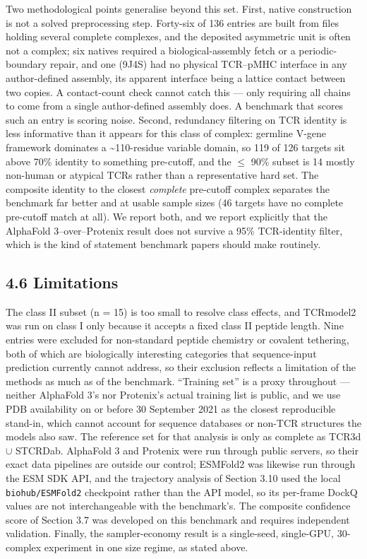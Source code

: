 \documentclass[
  11pt,
]{article}
\begin{document}
Two methodological points generalise beyond this set. First, native
construction is not a solved preprocessing step. Forty-six of 136
entries are built from files holding several complete complexes, and the
deposited asymmetric unit is often not a complex; six natives required a
biological-assembly fetch or a periodic-boundary repair, and one (9J4S)
had no physical TCR--pMHC interface in any author-defined assembly, its
apparent interface being a lattice contact between two copies. A
contact-count check cannot catch this --- only requiring all chains to
come from a single author-defined assembly does. A benchmark that scores
such an entry is scoring noise. Second, redundancy filtering on TCR
identity is less informative than it appears for this class of complex:
germline V-gene framework dominates a \textasciitilde110-residue
variable domain, so 119 of 126 targets sit above 70\% identity to
something pre-cutoff, and the \ensuremath{\leq} 90\% subset is 14 mostly non-human or
atypical TCRs rather than a representative hard set. The composite
identity to the closest \emph{complete} pre-cutoff complex separates the
benchmark far better and at usable sample sizes (46 targets have no
complete pre-cutoff match at all). We report both, and we report
explicitly that the AlphaFold 3--over--Protenix result does not survive
a 95\% TCR-identity filter, which is the kind of statement benchmark
papers should make routinely.

\subsection{4.6 Limitations}\label{limitations}

The class II subset (n = 15) is too small to resolve class effects, and
TCRmodel2 was run on class I only because it accepts a fixed class II
peptide length. Nine entries were excluded for non-standard peptide
chemistry or covalent tethering, both of which are biologically
interesting categories that sequence-input prediction currently cannot
address, so their exclusion reflects a limitation of the methods as much
as of the benchmark. ``Training set'' is a proxy throughout --- neither
AlphaFold 3's nor Protenix's actual training list is public, and we use
PDB availability on or before 30 September 2021 as the closest
reproducible stand-in, which cannot account for sequence databases or
non-TCR structures the models also saw. The reference set for that
analysis is only as complete as TCR3d \ensuremath{\cup} STCRDab. AlphaFold 3 and
Protenix were run through public servers, so their exact data pipelines
are outside our control; ESMFold2 was likewise run through the ESM SDK
API, and the trajectory analysis of Section 3.10 used the local
\texttt{biohub/ESMFold2} checkpoint rather than the API model, so its
per-frame DockQ values are not interchangeable with the benchmark's. The
composite confidence score of Section 3.7 was developed on this
benchmark and requires independent validation. Finally, the
sampler-economy result is a single-seed, single-GPU, 30-complex
experiment in one size regime, as stated above.
\end{document}
